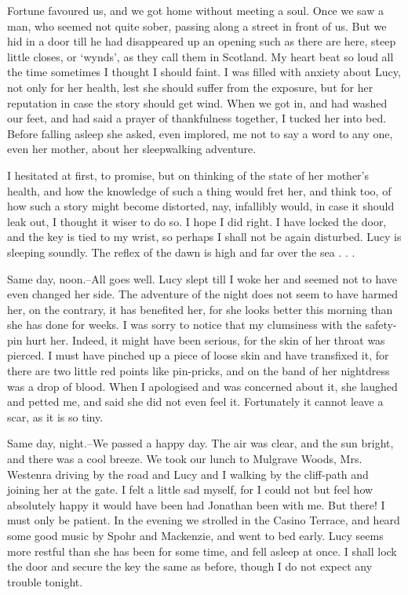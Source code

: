 Fortune favoured us, and we got home without meeting a soul. Once we saw a man, who seemed not quite sober, passing along a street in front of us. But we hid in a door till he had disappeared up an opening such as there are here, steep little closes, or `wynds', as they call them in Scotland. My heart beat so loud all the time sometimes I thought I should faint. I was filled with anxiety about Lucy, not only for her health, lest she should suffer from the exposure, but for her reputation in case the story should get wind. When we got in, and had washed our feet, and had said a prayer of thankfulness together, I tucked her into bed. Before falling asleep she asked, even implored, me not to say a word to any one, even her mother, about her sleepwalking adventure. 

I hesitated at first, to promise, but on thinking of the state of her mother's health, and how the knowledge of such a thing would fret her, and think too, of how such a story might become distorted, nay, infallibly would, in case it should leak out, I thought it wiser to do so. I hope I did right. I have locked the door, and the key is tied to my wrist, so perhaps I shall not be again disturbed. Lucy is sleeping soundly. The reflex of the dawn is high and far over the sea . . . 

Same day, noon.--All goes well. Lucy slept till I woke her and seemed not to have even changed her side. The adventure of the night does not seem to have harmed her, on the contrary, it has benefited her, for she looks better this morning than she has done for weeks. I was sorry to notice that my clumsiness with the safety-pin hurt her. Indeed, it might have been serious, for the skin of her throat was pierced. I must have pinched up a piece of loose skin and have transfixed it, for there are two little red points like pin-pricks, and on the band of her nightdress was a drop of blood. When I apologised and was concerned about it, she laughed and petted me, and said she did not even feel it. Fortunately it cannot leave a scar, as it is so tiny. 

Same day, night.--We passed a happy day. The air was clear, and the sun bright, and there was a cool breeze. We took our lunch to Mulgrave Woods, Mrs. Westenra driving by the road and Lucy and I walking by the cliff-path and joining her at the gate. I felt a little sad myself, for I could not but feel how absolutely happy it would have been had Jonathan been with me. But there! I must only be patient. In the evening we strolled in the Casino Terrace, and heard some good music by Spohr and Mackenzie, and went to bed early. Lucy seems more restful than she has been for some time, and fell asleep at once. I shall lock the door and secure the key the same as before, though I do not expect any trouble tonight. 

